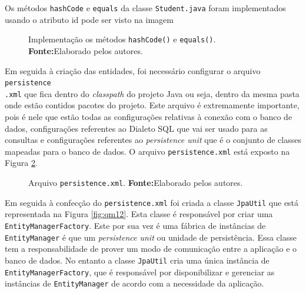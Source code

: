 	\pagebreak

	\par Os métodos \texttt{hashCode} e \texttt{equals} da
classe \texttt{Student.java} foram implementados \\usando o atributo id pode ser
visto na imagem 
	
	\begin{figure}[h!]
		
		\caption[Implementação os métodos hashCode() e equals()]{Implementação os
		métodos \texttt{hashCode()} e \texttt{equals()}.
			\textbf{Fonte:}Elaborado pelos autores.}
		\label{fig:desws11}
	\end{figure}
	
	\par Em seguida à criação das entidades, foi necessário configurar o arquivo
\texttt{persistence\\.xml} que fica dentro do \textit{classpath} do projeto
Java ou seja, dentro da mesma pasta onde estão contidos pacotes do
projeto. Este arquivo é extremamente importante, pois é nele que estão todas
as configurações relativas à conexão com o banco de dados, configurações
referentes ao Dialeto SQL que vai ser usado para as consultas e configurações
referentes ao \textit{persistence unit} que é o conjunto de classes mapeadas
para o banco de dados.	O arquivo \texttt{persistence.xml} está exposto na
Figura \ref{fig:qm11}.

	\begin{figure}[h!]
		
		\caption[Arquivo \texttt{persistence.xml}]{Arquivo \texttt{persistence.xml}.
		\textbf{Fonte:}Elaborado pelos autores.}
		\label{fig:qm11}
	\end{figure}
	
	\pagebreak
	
	\par Em seguida à confecção do \texttt{persistence.xml} foi criada a
classe \texttt{JpaUtil} que está representada na Figura \ref{fig:qm12}.
Esta classe é responsável por criar uma \texttt{EntityManagerFactory}. Este por
sua vez é uma  fábrica de instâncias de \texttt{EntityManager} é que um
\textit{persistence unit} ou unidade de persistência. Essa classe tem a
responsabilidade de prover um modo de comunicação entre a aplicação e o banco
de dados. No entanto a classe \texttt{JpaUtil} cria uma única instância de
\texttt{EntityManagerFactory}, que é responsável por disponibilizar e gerenciar
as instâncias de \texttt{EntityManager} de acordo com a necessidade da
aplicação.
	
